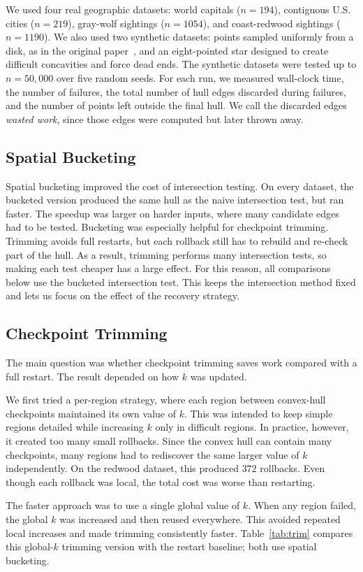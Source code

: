 \documentclass[a4paper,twoside]{article}
\begin{document}
We used four real geographic datasets: world capitals ($n=194$), contiguous U.S.
cities ($n=219$), gray-wolf sightings ($n=1054$), and coast-redwood sightings
($n=1190$). We also used two synthetic datasets: points sampled uniformly from a
disk, as in the original paper~\cite{moreira2007}, and an eight-pointed star designed
to create difficult concavities and force dead ends. The synthetic datasets were
tested up to $n=50{,}000$ over five random seeds.
For each run, we measured wall-clock time, the number of failures, the total number
of hull edges discarded during failures, and the number of points left outside the
final hull. We call the discarded edges \emph{wasted work}, since those edges were
computed but later thrown away.
\subsection{Spatial Bucketing}
Spatial bucketing improved the cost of intersection testing. On every dataset, the
bucketed version produced the same hull as the naive intersection test, but ran
faster. The speedup was larger on harder inputs, where many candidate edges had to be
tested.
Bucketing was especially helpful for checkpoint trimming. Trimming avoids full
restarts, but each rollback still has to rebuild and re-check part of the hull. As a
result, trimming performs many intersection tests, so making each test cheaper has a
large effect. For this reason, all comparisons below use the bucketed intersection
test. This keeps the intersection method fixed and lets us focus on the effect of the
recovery strategy.
\subsection{Checkpoint Trimming}
The main question was whether checkpoint trimming saves work compared with a full restart. The result depended on how \(k\) was updated. 

We first tried a per-region strategy, where each region between convex-hull checkpoints maintained its own value of \(k\). This was intended to keep simple regions detailed while increasing \(k\) only in difficult regions. In practice, however, it created too many small rollbacks. Since the convex hull can contain many checkpoints, many regions had to rediscover the same larger value of \(k\) independently. On the redwood dataset, this produced \(372\) rollbacks. Even though each rollback was local, the total cost was worse than restarting. 

The faster approach was to use a single global value of \(k\). When any region failed, the global \(k\) was increased and then reused everywhere. This avoided repeated local increases and made trimming consistently faster. Table~\ref{tab:trim} compares this global-\(k\) trimming version with the restart baseline; both use spatial bucketing. 
\end{document}
